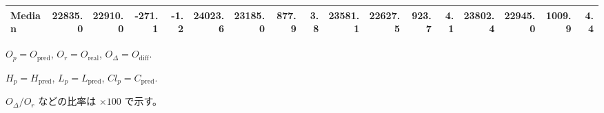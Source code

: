 \begin{threeparttable}
{\begin{tabular}{lrrrrrrrrrrrrrrrr}
 Median & 22835.0 & 22910.0 &     -271.1 &           -1.2 & 24023.6 & 23185.0 &      877.9 &            3.8 & 23581.1 & 22627.5 &      923.7 &            4.1 & 23802.4 & 22945.0 &      1009.9 &              4.4 \\
\bottomrule
\end{tabular}
}
\begin{tablenotes}\footnotesize
\item $O_p=O_{\text{pred}}$, $O_r=O_{\text{real}}$, $O_\Delta=O_{\text{diff}}$.
\item $H_p=H_{\text{pred}}$, $L_p=L_{\text{pred}}$, $Cl_p=C_{\text{pred}}$.
\item $O_\Delta/O_r$ などの比率は \(\times100\) で示す。
\end{tablenotes}
\end{threeparttable}
\endgroup
